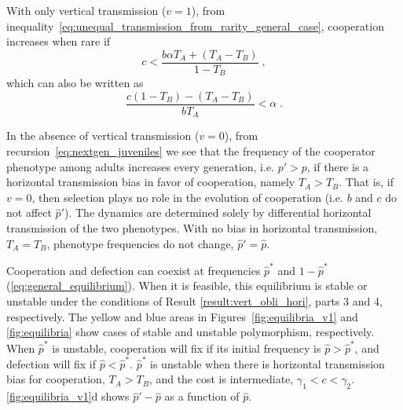 \documentclass[12pt]{extarticle}
\begin{document}
With only vertical transmission ($v=1$), from inequality~\ref{eq:unequal_transmission_from_rarity_general_case}, cooperation increases when rare if
\begin{equation} \label{eq:vert_hori}
c < \frac{b \alpha T_A + (T_A - T_B)}{1-T_B} \;,
\end{equation} 
which can also be written as
\begin{equation} \label{eq:vert_hori_alpha}
\frac{c (1-T_B)-(T_A-T_B)}{b T_A} < \alpha \;.
\end{equation}

In the absence of vertical transmission ($v=0$), from recursion~\ref{eq:nextgen_juveniles} we see that the frequency of the cooperator phenotype among adults increases every generation, i.e. $p'>p$, if there is a horizontal transmission bias in favor of cooperation, namely $T_A > T_B$.  
That is, if $v=0$, then selection plays no role in the evolution of cooperation (i.e. $b$ and $c$ do not affect $\hat p'$).
The dynamics are determined solely by differential horizontal transmission of the two phenotypes.
With no bias in horizontal transmission, $T_A = T_B$, phenotype frequencies do not change, $\hat p'=\hat p$.

Cooperation and defection can coexist at frequencies $\hat{p}^*$ and $1-\hat{p}^*$ (\autoref{eq:general_equilibrium}). 
When it is feasible, this equilibrium is stable or unstable under the conditions of Result \ref{result:vert_obli_hori}, parts 3 and 4, respectively. The yellow and blue areas in Figures~\ref{fig:equilibria_v1} and \ref{fig:equilibria} show cases of stable and unstable polymorphism, respectively.
When $\hat{p}^*$ is unstable, cooperation will fix if its initial frequency is $\hat{p}>\hat{p}^*$, and defection will fix if $\hat{p}<\hat{p}^*$.
$\hat{p}^*$ is unstable when there is horizontal transmission bias for cooperation, $T_A>T_B$, and the cost is intermediate, $\gamma_1 < c < \gamma_2$.
\autoref{fig:equilibria_v1}d shows $\hat{p}'-\hat{p}$ as a function of $\hat{p}$.
\end{document}
